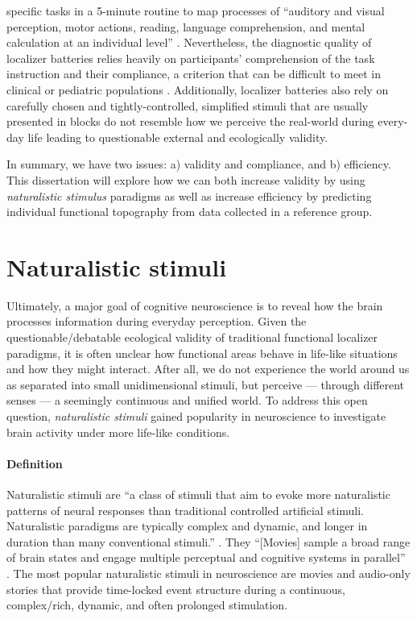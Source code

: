 specific tasks in a 5-minute routine to map processes of ``auditory and visual
perception, motor actions, reading, language comprehension, and mental
calculation at an individual level'' \citet{pinel2007fast}.
Nevertheless, the diagnostic quality of localizer batteries relies heavily on
participants' comprehension of the task instruction and their compliance, a
criterion that can be difficult to meet in clinical or pediatric populations
\citep{eickhoff2020towards, vanderwal2015inscapes, vanderwal2019movies}.
Additionally, localizer batteries also rely on carefully chosen and
tightly-controlled, simplified stimuli that are usually presented in blocks do
not resemble how we perceive the real-world during every-day life leading to
questionable external and ecologically validity.

In summary, we have two issues: a) validity and compliance, and b) efficiency.
This dissertation will explore how we can both increase validity by using
\textit{naturalistic stimulus} paradigms as well as increase efficiency by
predicting individual functional topography from data collected in a reference
group.


\section{Naturalistic stimuli}

Ultimately, a major goal of cognitive neuroscience is to reveal how the brain
processes information during everyday perception.
%
Given the questionable/debatable ecological validity of traditional functional
localizer paradigms, it is often unclear how functional areas behave in
life-like situations and how they might interact.
%
After all, we do not experience the world around us as separated into small
unidimensional stimuli, but perceive --- through different senses --- a
seemingly continuous and unified world.
%
To address this open question, \textit{naturalistic stimuli} gained popularity
in neuroscience to investigate brain activity under more life-like conditions.


\paragraph{Definition}

Naturalistic stimuli are ``a class of stimuli that aim to evoke more
naturalistic patterns of neural responses than traditional controlled artificial
stimuli. Naturalistic paradigms are typically complex and dynamic, and longer in
duration than many conventional stimuli.'' \citep{vanderwal2019movies}.
%
They ``[Movies] sample a broad range of brain states and engage multiple
perceptual and cognitive systems in parallel'' \citep{haxby2020naturalistic}.
The most popular naturalistic stimuli in neuroscience are movies and audio-only
stories that provide time-locked event structure during a continuous,
complex/rich, dynamic, and often prolonged stimulation.


